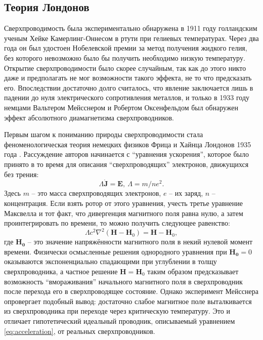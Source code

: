 \documentclass[14pt, a4paper]{extreport}
\numberwithin{equation}{section}
\begin{document}
\subsection{Теория Лондонов}

Сверхпроводимость была экспериментально обнаружена в 1911 году голландским ученым Хейке Камерлинг-Оннесом в ртути при гелиевых температурах. Через два года он был удостоен Нобелевской премии за метод получения жидкого гелия, без которого невозможно было бы получить необходимо низкую температуру. Открытие сверхпроводимости было скорее случайным, так как до этого никто даже и предполагать не мог возможности такого эффекта, не то что предсказать его. Впоследствии достаточно долго считалось, что явление заключается лишь в падении до нуля электрического сопротивления металлов, и только в 1933 году немцами Вальтером Мейсснером и Робертом Оксенфельдом был обнаружен эффект абсолютного диамагнетизма сверхпроводников. 

Первым шагом к пониманию природы сверхпроводимости стала феноменологическая теория немецких физиков Фрица и Хайнца Лондонов 1935 года \cite{london1935electromagnetic}. Рассуждение авторов начинается с ``уравнения ускорения'', которое было принято в то время для описания ``сверхпроводящих'' электронов, движущихся без трения:
\begin{equation}
	\Lambda \dot{\mathbf{J}} = \mathbf{E},\ \Lambda = m/ne^2. \label{eq:acceleration}
\end{equation}
Здесь $m$ -- это масса сверхпроводящих электронов, $e$ -- их заряд, $n$ -- концентрация. Если взять ротор от этого уравнения, учесть третье уравнение Максвелла и тот факт, что дивергенция магнитного поля равна нулю, а затем проинтегрировать по времени, то можно получить следующее равенство:
\begin{equation}
	\Lambda c^2 \nabla^2 (\mathbf{H}-\mathbf{H}_0) = \mathbf{H} - \mathbf{H}_0,\label{eq:london_inhomogeneous}
\end{equation}
где $\mathbf{H_0}$ -- это значение напряжённости магнитного поля в некий нулевой момент времени. Физически осмысленные решения однородного уравнения при $\mathbf{H_0} = 0$ оказываются экспоненциально спадающими при углублении в толщу сверхпроводника, а частное решение $\mathbf{H} = \mathbf{H}_0$ таким образом предсказывает возможность ``вмораживания'' начального магнитного поля в сверхпроводник после перехода его в сверхпроводящее состояние. Однако эксперимент Мейсснера опровергает подобный вывод: достаточно слабое магнитное поле выталкивается из сверхпроводника при переходе через критическую температуру. Это и отличает гипотетический идеальный проводник, описываемый уравнением \eqref{eq:acceleration}, от реальных сверхпроводников.
\end{document}
